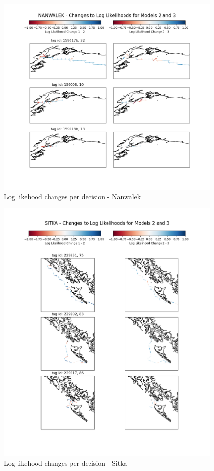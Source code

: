 \documentclass[11pt]{article}
\begin{document}
\begin{figure}[h!] 
	\centering
  \includegraphics[width=140mm]{figures/nanwalek_map.png}
  \caption{Log likehood changes per decision - Nanwalek}
  \label{fig:nanwalek_map}
\end{figure}

\begin{figure}[h!] 
	\centering
  \includegraphics[width=140mm]{figures/sitka_map.png}
  \caption{Log likehood changes per decision - Sitka}
  \label{fig:sitka_map}
\end{figure}
\end{document}
